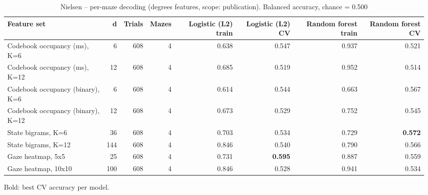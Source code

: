 \begin{table}[t]
\centering
\caption{Nielsen -- per-maze decoding (degrees features, scope: publication). Balanced accuracy, chance = 0.500}
\label{tab:permaze_Nielsen}
\begin{tabular}{lrrrrrrr}
\toprule
Feature set & d & Trials & Mazes & Logistic (L2) train & Logistic (L2) CV & Random forest train & Random forest CV \\
\midrule
Codebook occupancy (ms), K=6 & 6 & 608 & 4 & 0.638 & 0.547 & 0.937 & 0.521 \\
Codebook occupancy (ms), K=12 & 12 & 608 & 4 & 0.685 & 0.519 & 0.952 & 0.514 \\
Codebook occupancy (binary), K=6 & 6 & 608 & 4 & 0.614 & 0.544 & 0.663 & 0.567 \\
Codebook occupancy (binary), K=12 & 12 & 608 & 4 & 0.673 & 0.529 & 0.752 & 0.545 \\
State bigrams, K=6 & 36 & 608 & 4 & 0.703 & 0.534 & 0.729 & \textbf{0.572} \\
State bigrams, K=12 & 144 & 608 & 4 & 0.846 & 0.540 & 0.790 & 0.566 \\
Gaze heatmap, 5x5 & 25 & 608 & 4 & 0.731 & \textbf{0.595} & 0.887 & 0.559 \\
Gaze heatmap, 10x10 & 100 & 608 & 4 & 0.846 & 0.528 & 0.941 & 0.534 \\
\bottomrule
\end{tabular}
\par\smallskip
{\footnotesize Bold: best CV accuracy per model.}
\end{table}
